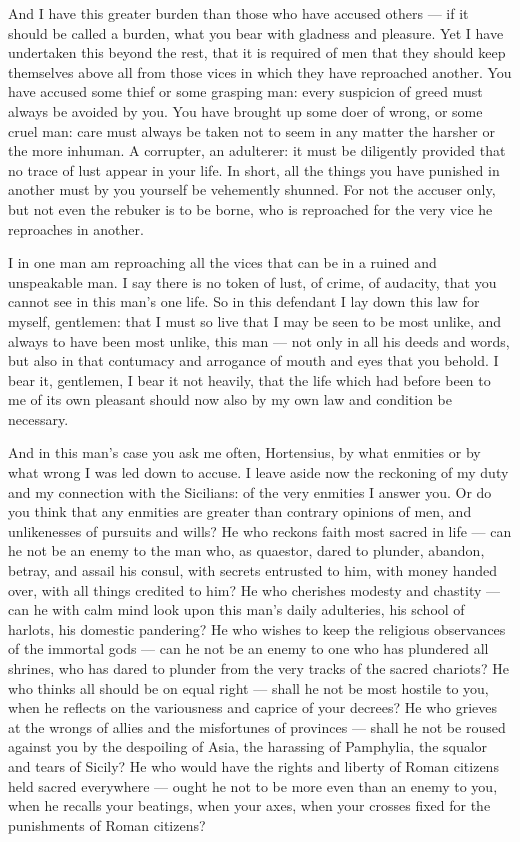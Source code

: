  And I have this greater burden than those who have accused others --- if it should be called a burden, what you bear with gladness and pleasure. Yet I have undertaken this beyond the rest, that it is required of men that they should keep themselves above all from those vices in which they have reproached another. You have accused some thief or some grasping man: every suspicion of greed must always be avoided by you. You have brought up some doer of wrong, or some cruel man: care must always be taken not to seem in any matter the harsher or the more inhuman. A corrupter, an adulterer: it must be diligently provided that no trace of lust appear in your life. In short, all the things you have punished in another must by you yourself be vehemently shunned. For not the accuser only, but not even the rebuker is to be borne, who is reproached for the very vice he reproaches in another.

 I in one man am reproaching all the vices that can be in a ruined and unspeakable man. I say there is no token of lust, of crime, of audacity, that you cannot see in this man's one life. So in this defendant I lay down this law for myself, gentlemen: that I must so live that I may be seen to be most unlike, and always to have been most unlike, this man --- not only in all his deeds and words, but also in that contumacy and arrogance of mouth and eyes that you behold. I bear it, gentlemen, I bear it not heavily, that the life which had before been to me of its own pleasant should now also by my own law and condition be necessary.

 And in this man's case you ask me often, Hortensius, by what enmities or by what wrong I was led down to accuse. I leave aside now the reckoning of my duty and my connection with the Sicilians: of the very enmities I answer you. Or do you think that any enmities are greater than contrary opinions of men, and unlikenesses of pursuits and wills? He who reckons faith most sacred in life --- can he not be an enemy to the man who, as quaestor, dared to plunder, abandon, betray, and assail his consul, with secrets entrusted to him, with money handed over, with all things credited to him? He who cherishes modesty and chastity --- can he with calm mind look upon this man's daily adulteries, his school of harlots, his domestic pandering? He who wishes to keep the religious observances of the immortal gods --- can he not be an enemy to one who has plundered all shrines, who has dared to plunder from the very tracks of the sacred chariots? He who thinks all should be on equal right --- shall he not be most hostile to you, when he reflects on the variousness and caprice of your decrees? He who grieves at the wrongs of allies and the misfortunes of provinces --- shall he not be roused against you by the despoiling of Asia, the harassing of Pamphylia, the squalor and tears of Sicily? He who would have the rights and liberty of Roman citizens held sacred everywhere --- ought he not to be more even than an enemy to you, when he recalls your beatings, when your axes, when your crosses fixed for the punishments of Roman citizens?

